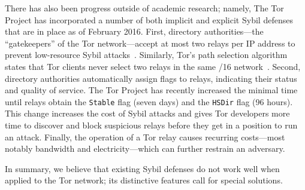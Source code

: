 There has also been progress outside of academic research; namely, The Tor
Project has incorporated a number of both implicit and explicit Sybil defenses
that are in place as of February 2016.  First, directory authorities---the
``gatekeepers'' of the Tor network---accept at most two relays per IP address to
prevent low-resource Sybil attacks~\cite{Bauer2007a,Bauer2007b}.  Similarly,
Tor's path selection algorithm states that Tor clients never select two relays
in the same /16 network~\cite{path-spec}.  Second, directory authorities
automatically assign flags to relays, indicating their status and quality of
service.  The Tor Project has recently increased the minimal time until relays
obtain the \texttt{Stable} flag (seven days) and the \texttt{HSDir} flag (96
hours).  This change increases the cost of Sybil attacks and gives Tor
developers more time to discover and block suspicious relays before they get in
a position to run an attack.  Finally, the operation of a Tor relay causes
recurring costs---most notably bandwidth and electricity---which can further
restrain an adversary.

In summary, we believe that existing Sybil defenses do not work well when
applied to the Tor network; its distinctive features call for special solutions.
